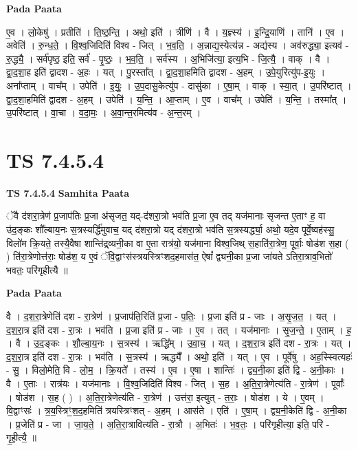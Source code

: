 \documentclass[17pt]{extarticle}
\begin{document}
\textbf{Pada Paata} \newline

ए॒व । लो॒केषु॑ । प्रतीति॑ । ति॒ष्ठ॒न्ति॒ । अथो॒ इति॑ । त्रीणि॑ । वै । य॒ज्ञ्स्य॑ । इ॒न्द्रि॒याणि॑ । तानि॑ । ए॒व । अवेति॑ । रु॒न्ध॒ते॒ । वि॒श्व॒जिदिति॑ विश्व - जित् । भ॒व॒ति॒ । अ॒न्नाद्य॒स्येत्य॑न्न - अद्य॑स्य । अव॑रुद्ध्या॒ इत्यव॑ - रु॒द्ध्यै॒ । सर्व॑पृष्ठ॒ इति॒ सर्व॑ - पृ॒ष्ठः॒ । भ॒व॒ति॒ । सर्व॑स्य । अ॒भिजि॑त्या॒ इत्य॒भि - जि॒त्यै॒ । वाक् । वै । द्वा॒द॒शा॒ह इति॑ द्वादश - अ॒हः । यत् । पु॒रस्ता᳚त् । द्वा॒द॒शा॒हमिति द्वादश - अ॒हम् । उ॒पे॒युरित्यु॑प-इ॒युः । अना᳚प्ताम् । वाच᳚म् । उपेति॑ । इ॒युः॒ । उ॒प॒दासु॒केत्यु॑प - दासु॑का । ए॒षा॒म् । वाक् । स्या॒त् । उ॒परि॑ष्टात् । द्वा॒द॒शा॒हमिति॑ द्वादश - अ॒हम् । उपेति॑ । य॒न्ति॒ । आ॒प्ताम् । ए॒व । वाच᳚म् । उपेति॑ । य॒न्ति॒ । तस्मा᳚त् । उ॒परि॑ष्टात् । वा॒चा । व॒दा॒मः॒ । अ॒वा॒न्त॒रमित्य॑व - अ॒न्त॒रम् ।  \newline




\section*{ TS 7.4.5.4 }

\textbf{TS 7.4.5.4 } \newline
\textbf{Samhita Paata} \newline

ॅवै द॑शरा॒त्रेण॑ प्र॒जाप॑तिः प्र॒जा अ॑सृजत॒ यद्-द॑शरा॒त्रो भव॑ति प्र॒जा ए॒व तद् यज॑मानाः सृजन्त ए॒ताꣳ ह॒ वा उ॑द॒ङ्कः शौ᳚ल्बाय॒नः स॒त्रस्यर्द्धि॑मुवाच॒ यद् द॑शरा॒त्रो यद् द॑शरा॒त्रो भव॑ति स॒त्रस्यर्द्ध्या॒ अथो॒ यदे॒व पूर्वे॒ष्वह॑स्सु॒ विलो॑म क्रि॒यते॒ तस्यै॒वैषा शान्ति॑द्र्व्यनी॒का वा ए॒ता रात्र॑यो॒ यज॑माना विश्व॒जिथ् स॒हाति॑रा॒त्रेण॒ पूर्वाः॒ षोड॑श स॒हा ( ) ति॑रा॒त्रेणोत्त॑राः॒ षोड॑श॒ य ए॒वं ॅवि॒द्वाꣳस॑स्त्रयस्त्रिꣳशद॒हमास॑त॒ ऐषां᳚ द्व्यनी॒का प्र॒जा जा॑यते ऽतिरा॒त्राव॒भितो॑ भवतः॒ परि॑गृहीत्यै ॥ \newline

\textbf{Pada Paata} \newline

वै । द॒श॒रा॒त्रेणेति॑ दश - रा॒त्रेण॑ । प्र॒जाप॑ति॒रिति॑ प्र॒जा - प॒तिः॒ । प्र॒जा इति॑ प्र - जाः । अ॒सृ॒ज॒त॒ । यत् । द॒श॒रा॒त्र इति॑ दश - रा॒त्रः । भव॑ति । प्र॒जा इति॑ प्र - जाः । ए॒व । तत् । यज॑मानाः । सृ॒ज॒न्ते॒ । ए॒ताम् । ह॒ । वै । उ॒द॒ङ्कः । शौ॒ल्बा॒य॒नः । स॒त्रस्य॑ । ऋद्धि᳚म् । उ॒वा॒च॒ । यत् । द॒श॒रा॒त्र इति॑ दश - रा॒त्रः । यत् । द॒श॒रा॒त्र इति॑ दश - रा॒त्रः । भव॑ति । स॒त्रस्य॑ । ऋद्ध्यै᳚ । अथो॒ इति॑ । यत् । ए॒व । पूर्वे॑षु । अह॒स्स्वित्यहः॑ - सु॒ । विलो॒मेति॒ वि - लो॒म॒ । क्रि॒यते᳚ । तस्य॑ । ए॒व । ए॒षा । शान्तिः॑ । द्व्य॒नी॒का इति॑ द्वि - अ॒नी॒काः । वै । ए॒ताः । रात्र॑यः । यज॑मानाः । वि॒श्व॒जिदिति॑ विश्व - जित् । स॒ह । अ॒ति॒रा॒त्रेणेत्य॑ति - रा॒त्रेण॑ । पूर्वाः᳚ । षोड॑श । स॒ह ( ) । अ॒ति॒रा॒त्रेणेत्य॑ति - रा॒त्रेण॑ । उत्त॑रा॒ इत्युत् - त॒राः॒ । षोड॑श । ये । ए॒वम् । वि॒द्वाꣳसः॑ । त्र॒य॒स्त्रिꣳ॒॒श॒द॒हमिति॑ त्रयस्त्रिꣳशत् - अ॒हम् । आस॑ते । एति॑ । ए॒षा॒म् । द्व्य॒नी॒केति॑ द्वि - अ॒नी॒का । प्र॒जेति॑ प्र - जा । जा॒य॒ते॒ । अ॒ति॒रा॒त्रावित्य॑ति - रा॒त्रौ । अ॒भितः॑ । भ॒व॒तः॒ । परि॑गृहीत्या॒ इति॒ परि॑ - गृ॒ही॒त्यै॒ ॥  \newline
\end{document}
